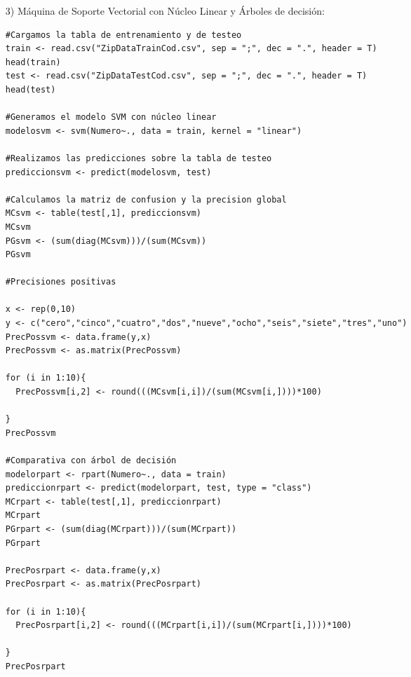 \documentclass[11pt,a4paper]{report}
\begin{document}
\begin{itemize}
\item[3)] Máquina de Soporte Vectorial con Núcleo Linear y Árboles de decisión:
\begin{verbatim}
#Cargamos la tabla de entrenamiento y de testeo
train <- read.csv("ZipDataTrainCod.csv", sep = ";", dec = ".", header = T)
head(train)
test <- read.csv("ZipDataTestCod.csv", sep = ";", dec = ".", header = T)
head(test)

#Generamos el modelo SVM con núcleo linear
modelosvm <- svm(Numero~., data = train, kernel = "linear")

#Realizamos las predicciones sobre la tabla de testeo
prediccionsvm <- predict(modelosvm, test)

#Calculamos la matriz de confusion y la precision global
MCsvm <- table(test[,1], prediccionsvm)
MCsvm
PGsvm <- (sum(diag(MCsvm)))/(sum(MCsvm))
PGsvm

#Precisiones positivas

x <- rep(0,10)
y <- c("cero","cinco","cuatro","dos","nueve","ocho","seis","siete","tres","uno")
PrecPossvm <- data.frame(y,x)
PrecPossvm <- as.matrix(PrecPossvm)

for (i in 1:10){
  PrecPossvm[i,2] <- round(((MCsvm[i,i])/(sum(MCsvm[i,])))*100)
  
}
PrecPossvm

#Comparativa con árbol de decisión
modelorpart <- rpart(Numero~., data = train)
prediccionrpart <- predict(modelorpart, test, type = "class")
MCrpart <- table(test[,1], prediccionrpart)
MCrpart
PGrpart <- (sum(diag(MCrpart)))/(sum(MCrpart))
PGrpart

PrecPosrpart <- data.frame(y,x)
PrecPosrpart <- as.matrix(PrecPosrpart)

for (i in 1:10){
  PrecPosrpart[i,2] <- round(((MCrpart[i,i])/(sum(MCrpart[i,])))*100)
  
}
PrecPosrpart

\end{verbatim}


\end{itemize}
\end{document}
